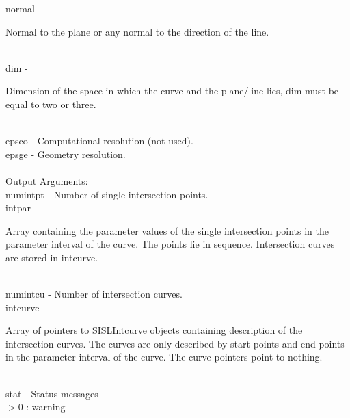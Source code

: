         \>\>    {\fov normal}   \> - \>
        \begin{minipg2}
          Normal to the plane or any normal to the direction of the
          line.
        \end{minipg2}\\[0.8ex]
        \>\>    {\fov dim}      \> - \> \begin{minipg2}
                                Dimension of the space in which the
                                curve and the plane/line lies, {\fov
                                  dim} must be equal to two or three.
                                \end{minipg2}\\[0.8ex]
        \>\>    {\fov epsco}    \> - \> Computational resolution (not used).\\
        \>\>    {\fov epsge}    \> - \> Geometry resolution.\\
\\
        \>Output Arguments:\\
        \>\>    {\fov numintpt}\> - \>  Number of single intersection points.\\
        \>\>    {\fov intpar}   \> - \> \begin{minipg2}
                        Array containing the parameter values of the
                        single intersection points in the parameter
                        interval of the curve. The points lie in sequence.
                        Intersection curves are stored in intcurve.
                                \end{minipg2}\\[0.8ex]
        \>\>    {\fov numintcu}\> - \>Number of intersection curves.\\
\newpagetabs
        \>\>    {\fov intcurve}\> - \>  \begin{minipg2}
                        Array of pointers to SISLIntcurve objects
                        containing description of the intersection
                        curves. The curves are only described by start
                        points and end points in
                        the parameter interval of the curve. The
                        curve pointers point
                        to nothing.
                                \end{minipg2}\\[0.8ex]
        \>\>    {\fov stat}     \> - \> Status messages\\
                \>\>\>\>\>              $> 0$   : warning\\
